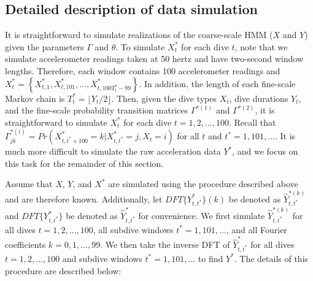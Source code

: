 
\subsection{Detailed description of data simulation}

It is straightforward to simulate realizations of the coarse-scale HMM ($X$ and $Y$) given the parameters $\Gamma$ and $\theta$. 
To simulate $X^*_t$ for each dive $t$, note that we simulate accelerometer readings taken at 50 hertz and have two-second window lengths. Therefore, each window contains 100 accelerometer readings and $X^*_t = \left\{X^*_{t,1}, X^*_{t,101}, \ldots, X^*_{t,100T^*_t-99}\right\}$. In addition, the length of each fine-scale Markov chain is $T^*_t = \lfloor Y_t/2 \rfloor$. Then, given the dive types $X_t$, dive durations $Y_t$, and the fine-scale probability transition matrices $\Gamma^{*(1)}$ and $\Gamma^{*(2)}$, it is straightforward to simulate $X^*_t$ for each dive $t = 1,2,\ldots,100$. Recall that $\Gamma^{*(i)}_{jk} = Pr(X^*_{t,t^*+100} = k | X^*_{t,t^*} = j, X_t = i)$ for all $t$ and $t^* = 1, 101, \ldots$. It is much more difficult to simulate the raw acceleration data $Y^*$, and we focus on this task for the remainder of this section. 

Assume that $X$, $Y$, and $X^*$ are simulated using the procedure described above and are therefore known. Additionally, let $DFT\{Y^*_{t,t^*}\}(k)$ be denoted as $\hat{Y}^{*(k)}_{t,t^*}$ and $DFT\{Y^*_{t,t^*}\}$ be denoted as $\hat{Y}^*_{t,t^*}$ for convenience. We first simulate $\hat Y^{*(k)}_{t,t^*}$ for all dives $t = 1,2,\ldots,100$, all subdive windows $t^* = 1,101,\ldots$, and all Fourier coefficients $k = 0,1,\ldots,99$. We then take the inverse DFT of $\hat{Y}^*_{t,t^*}$ for all dives $t = 1,2,\ldots,100$ and subdive windows $t^* = 1,101,\ldots$ to find $Y^*$. The details of this procedure are described below:

